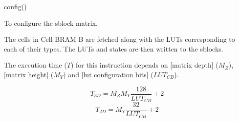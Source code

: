 

\format

config()

\purpose

To configure the sblock matrix.

\description

The cells in Cell BRAM B are fetched along with the LUTs corresponding to each of their types.
The LUTs and states are then written to the sblocks.

\notes

The execution time ($T$) for this instruction depends on [matrix depth] ($M_Z$), [matrix height] ($M_Y$) and [lut configuration bits] ($LUT_{CB}$).

$$ T_{3D} = M_Z M_Y \frac{ 128 }{ LUT_{CB} } + 2 $$
$$ T_{2D} = M_Y \frac{ 32 }{ LUT_{CB} } + 2 $$
